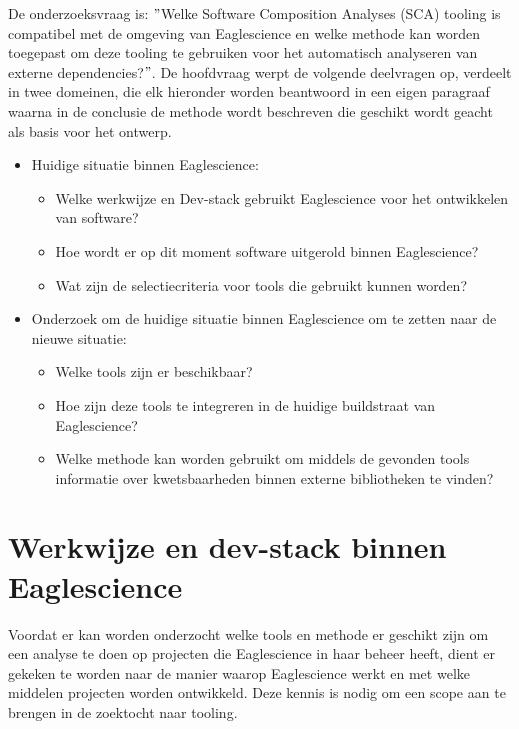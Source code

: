 De onderzoeksvraag is: $"$Welke Software Composition Analyses (SCA) tooling is compatibel met de omgeving van Eaglescience en welke methode kan worden toegepast om deze tooling te gebruiken voor het automatisch analyseren van externe dependencies?$"$. De hoofdvraag werpt de volgende deelvragen op, verdeelt in twee domeinen, die elk hieronder worden beantwoord in een eigen paragraaf waarna in de conclusie de methode wordt beschreven die geschikt wordt geacht als basis voor het ontwerp.
\begin{itemize}
    \item Huidige situatie binnen Eaglescience:
    \begin{itemize}
        \item Welke werkwijze en Dev-stack gebruikt Eaglescience voor het ontwikkelen van software?
        \item Hoe wordt er op dit moment software uitgerold binnen Eaglescience?
        \item Wat zijn de selectiecriteria voor tools die gebruikt kunnen worden?
    \end{itemize}

    \item Onderzoek om de huidige situatie binnen Eaglescience om te zetten naar de nieuwe situatie:
    \begin{itemize}
        \item Welke tools zijn er beschikbaar?
        \item Hoe zijn deze tools te integreren in de huidige buildstraat van Eaglescience?
        \item Welke methode kan worden gebruikt om middels de gevonden tools informatie over kwetsbaarheden binnen externe bibliotheken te vinden?
    \end{itemize}
\end{itemize}


\section{Werkwijze en dev-stack binnen Eaglescience}\label{sec:werkwijze-en-dev-stack-binnen-eaglescience}
Voordat er kan worden onderzocht welke tools en methode er geschikt zijn om een analyse te doen op projecten die Eaglescience in haar beheer heeft, dient er gekeken te worden naar de manier waarop Eaglescience werkt en met welke middelen projecten worden ontwikkeld. Deze kennis is nodig om een scope aan te brengen in de zoektocht naar tooling.

